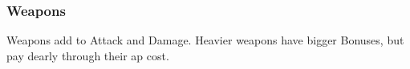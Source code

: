\subsubsection*{Weapons}

Weapons add to Attack and Damage.
Heavier weapons have bigger Bonuses, but pay dearly through their \gls{ap} cost.

